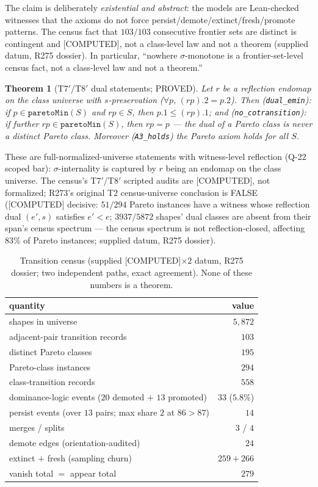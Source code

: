 \documentclass[11pt,a4paper]{article}
\newtheorem{theorem}{Theorem}
\theoremstyle{definition}
\begin{document}
The claim is deliberately \emph{existential and abstract}: the models
are Lean-checked witnesses that the axioms do not force
persist/demote/extinct/fresh/promote patterns. The census fact that
$103/103$ consecutive frontier sets are distinct is contingent and
[COMPUTED], not a class-level law and not a theorem (supplied datum,
R275 dossier). In particular, ``nowhere $\sigma$-monotone is a
frontier-set-level census fact, not a class-level law and not a
theorem.''

\begin{theorem}[T7$'$/T8$'$ dual statements; PROVED]
  \label{thm:dual}
  Let $r$ be a reflection endomap on the class universe with
  $s$-preservation ($\forall p,\,(rp).2=p.2$). Then
  (\texttt{dual\_emin}): if $p\in\mathtt{paretoMin}(S)$ and
  $rp\in S$, then $p.1\le(rp).1$; and (\texttt{no\_cotransition}): if
  further $rp\in\mathtt{paretoMin}(S)$, then $rp=p$ --- the dual of a
  Pareto class is never a distinct Pareto class. Moreover
  (\texttt{A3\_holds}) the Pareto axiom holds for all $S$.
\end{theorem}

These are full-normalized-universe statements with witness-level
reflection (Q-22 scoped bar): $\sigma$-internality is captured by $r$
being an endomap on the class universe. The census's T7$'$/T8$'$ scripted
audits are [COMPUTED], not formalized; R273's original T2
census-universe conclusion is FALSE ([COMPUTED] decisive: $51/294$
Pareto instances have a witness whose reflection dual $(e',s)$ satisfies
$e'<e$; $3937/5872$ shapes' dual classes are absent from their span's
census spectrum --- the census spectrum is not reflection-closed,
affecting $83\%$ of Pareto instances; supplied datum, R275 dossier).

\begin{table}[t]
  \centering
  \caption{Transition census (supplied [COMPUTED]$\times2$ datum, R275
    dossier; two independent paths, exact agreement). None of these
    numbers is a theorem.}
  \label{tab:census}
  \begin{tabular}{lr}
    \toprule
    quantity & value \\
    \midrule
    shapes in universe & $5{,}872$ \\
    adjacent-pair transition records & $103$ \\
    distinct Pareto classes & $195$ \\
    Pareto-class instances & $294$ \\
    class-transition records & $558$ \\
    dominance-logic events ($20$ demoted $+$ $13$ promoted) & $33$ ($5.8\%$) \\
    persist events (over $13$ pairs; max share $2$ at $86{>}87$) & $14$ \\
    merges / splits & $3$ / $4$ \\
    demote edges (orientation-audited) & $24$ \\
    extinct $+$ fresh (sampling churn) & $259+266$ \\
    vanish total $=$ appear total & $279$ \\
    \bottomrule
  \end{tabular}
\end{table}
\end{document}
